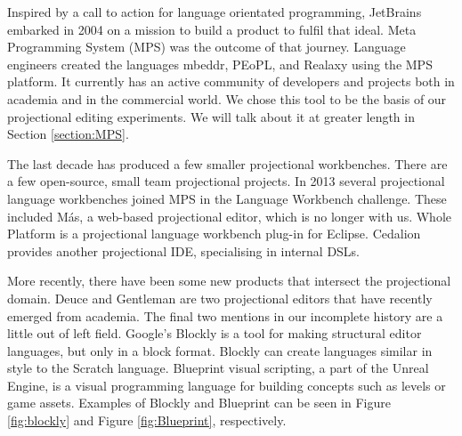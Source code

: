 Inspired by a call to action for language orientated programming\cite{dmitriev2004language}, JetBrains embarked in 2004 on a mission to build a product to fulfil that ideal.  
Meta Programming System (MPS) was the outcome of that journey.   
Language engineers created the languages mbeddr, PEoPL, and Realaxy using the MPS platform.  
It currently has an active community of developers and projects both in academia and in the commercial world. 
We chose this tool to be the basis of our projectional editing experiments. 
We will talk about it at greater length in Section \ref{section:MPS}.

The last decade has produced a few smaller projectional workbenches.
There are a few open-source, small team projectional projects. 
In 2013 several projectional language workbenches joined MPS in the Language Workbench challenge\cite{erdweg2015evaluating}.
These included M\'as, a web-based projectional editor, which is no longer with us\cite{MasPostMortem}.
Whole Platform\cite{WholePlatformProductPage} is a projectional language workbench plug-in for Eclipse.
Cedalion\cite{lorenz2011cedalion} provides another projectional IDE, specialising in internal DSLs.

More recently, there have been some new products that intersect the projectional domain.
Deuce\cite{hempel2018deuce} and Gentleman\cite{lafontant2020gentleman_SLR} are two projectional editors that have recently emerged from academia.
The final two mentions in our incomplete history are a little out of left field. 
Google's Blockly\cite{Blockly_ProductPage} is a tool for making structural editor languages, but only in a block format.
Blockly can create languages similar in style to the Scratch language. 
Blueprint visual scripting, a part of the Unreal Engine, is a visual programming language for building concepts such as levels or game assets.
Examples of Blockly and Blueprint can be seen in Figure \ref{fig:blockly} and Figure \ref{fig:Blueprint}, respectively.

